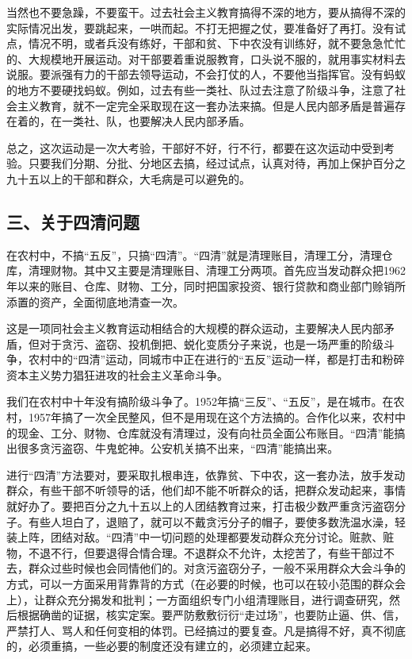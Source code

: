 当然也不要急躁，不要蛮干。过去社会主义教育搞得不深的地方，要从搞得不深的实际情况出发，要跳起来，一哄而起。不打无把握之仗，要准备好了再打。没有试点，情况不明，或者兵没有练好，干部和贫、下中农没有训练好，就不要急急忙忙的、大规模地开展运动。对干部要着重说服教育，口头说不服的，就用事实材料去说服。要派强有力的干部去领导运动，不会打仗的人，不要他当指挥官。没有蚂蚁的地方不要硬找蚂蚁。例如，过去有些一类社、队过去注意了阶级斗争，注意了社会主义教育，就不一定完全采取现在这一套办法来搞。但是人民内部矛盾是普遍存在着的，在一类社、队，也要解决人民内部矛盾。

总之，这次运动是一次大考验，干部好不好，行不行，都要在这次运动中受到考验。只要我们分期、分批、分地区去搞，经过试点，认真对待，再加上保护百分之九十五以上的干部和群众，大毛病是可以避免的。

\subsection{三、关于四清问题}

在农村中，不搞“五反”，只搞“四清”。“四清”就是清理账目，清理工分，清理仓库，清理财物。其中又主要是清理账目、清理工分两项。首先应当发动群众把1962年以来的账目、仓库、财物、工分，同时把国家投资、银行贷款和商业部门赊销所添置的资产，全面彻底地清查一次。

这是一项同社会主义教育运动相结合的大规模的群众运动，主要解决人民内部矛盾，但对于贪污、盗窃、投机倒把、蜕化变质分子来说，也是一场严重的阶级斗争，农村中的“四清”运动，同城市中正在进行的“五反”运动一样，都是打击和粉碎资本主义势力猖狂进攻的社会主义革命斗争。

我们在农村中十年没有搞阶级斗争了。1952年搞“三反”、“五反”，是在城市。在农村，1957年搞了一次全民整风，但不是用现在这个方法搞的。合作化以来，农村中的现金、工分、财物、仓库就没有清理过，没有向社员全面公布账目。“四清”能搞出很多贪污盗窃、牛鬼蛇神。公安机关搞不出来，“四清”能搞出来。

进行“四清”方法要对，要采取扎根串连，依靠贫、下中农，这一套办法，放手发动群众，有些干部不听领导的话，他们却不能不听群众的话，把群众发动起来，事情就好办了。要把百分之九十五以上的人团结教育过来，打击极少数严重贪污盗窃分子。有些人坦白了，退赔了，就可以不戴贪污分子的帽子，要使多数洗温水澡，轻装上阵，团结对敌。“四清”中一切问题的处理都要发动群众充分讨论。赃款、赃物，不退不行，但要退得合情合理。不退群众不允许，太挖苦了，有些干部过不去，群众过些时候也会同情他们的。对贪污盗窃分子，一般不采用群众大会斗争的方式，可以一方面采用背靠背的方式（在必要的时候，也可以在较小范围的群众会上），让群众充分揭发和批判；一方面组织专门小组清理账目，进行调查研究，然后根据确凿的证据，核实定案。要严防敷敷衍衍“走过场”，也要防止逼、供、信，严禁打人、骂人和任何变相的体罚。已经搞过的要复查。凡是搞得不好，真不彻底的，必须重搞，一些必要的制度还没有建立的，必须建立起来。

